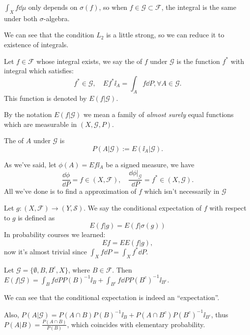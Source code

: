 \begin{remark}
    $\int_X f\dd \mu$ only depends on $\sigma(f)$, so when $f\in \mathscr{G}
	\subset \mathscr{F}$, the integral is the same under both $\sigma$-algebra.
\end{remark}

We can see that the condition $L_2$ is a little strong, so we can reduce
it to existence of integrals.

\begin{definition}
	Let $f\in \mathscr{F}$ whose integral exists,
	we say the 
	of $f$ under $\mathscr{G}$ is the function $f^*$ with integral which satisfies:
	\[
	f^*\in \mathscr{G},\quad Ef^*\ii_A = \int_A f\dd P, \forall A\in \mathscr{G}.
	\]
	This function is denoted by $E(f|\mathscr{G})$.
\end{definition}

By the notation $E(f|\mathscr{G})$ we mean a family of \textit{almost surely}
equal functions which are measurable in $(X, \mathscr{G}, P)$.

The  of $A$ under $\mathscr{G}$ is
\[
P(A|\mathscr{G}) := E(\ii_A | \mathscr{G}).
\]

As we've said, let $\phi(A) = Ef\ii_A$ be a signed measure,
we have
\[
\frac{\dd \phi}{\dd P} = f\in (X, \mathscr{F}), \quad
\frac{\dd \phi|_{\mathscr{G}}}{\dd P} = f^* \in (X, \mathscr{G}).
\]
All we've done is to find a approximation of $f$ which isn't
necessarily in  $\mathscr{G}$

Let $g:(X, \mathscr{F}) \to (Y, \mathscr{S})$.
We say the conditional expectation of $f$ with respect to $g$ is defined as
\[
E(f|g) = E(f|\sigma(g))
\]
In probability courses we learned:
\[
Ef = EE(f|g),
\]
now it's almost trivial since $\int_X f\dd P = \int_X f^* \dd P$.

\begin{example}
    Let $\mathscr{G} = \{\emptyset, B, B^c, X\}$, where $B\in \mathscr{F}$.
	Then $E(f|\mathscr{G}) = \int_B f\dd P P(B)^{-1} \ii_B
	+ \int_{B^c}f\dd P P(B^c)^{-1} \ii_{B^c}$.

	We can see that the conditional expectation is indeed an ``expectation''.

	Also, $P(A|\mathscr{G}) = P(A\cap B)P(B)^{-1}\ii_B
	+ P(A\cap B^c)P(B^c)^{-1}\ii_{B^c}$,
	thus $P(A|B) = \frac{P(A\cap B)}{P(B)}$, which coincides with elementary
	probability.
\end{example}

